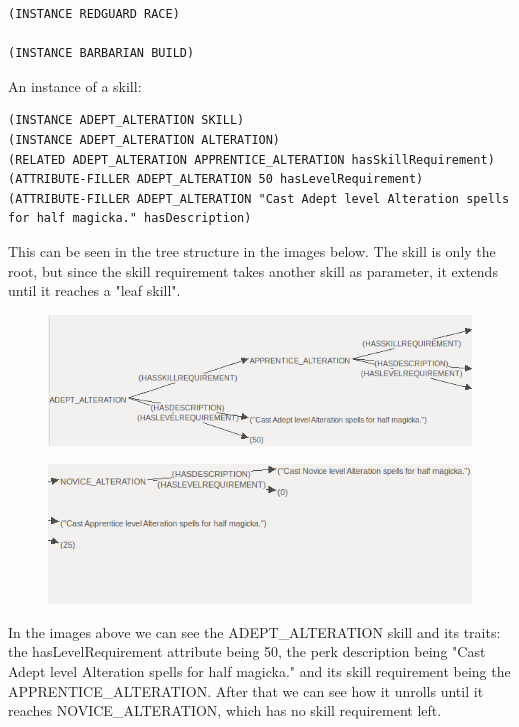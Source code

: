 \documentclass[a4paper,12pt]{report}
\begin{document}
\begin{lstlisting}
(INSTANCE REDGUARD RACE)

(INSTANCE BARBARIAN BUILD)
\end{lstlisting}

An instance of a skill:

\begin{lstlisting}
(INSTANCE ADEPT_ALTERATION SKILL)
(INSTANCE ADEPT_ALTERATION ALTERATION)
(RELATED ADEPT_ALTERATION APPRENTICE_ALTERATION hasSkillRequirement)
(ATTRIBUTE-FILLER ADEPT_ALTERATION 50 hasLevelRequirement)
(ATTRIBUTE-FILLER ADEPT_ALTERATION "Cast Adept level Alteration spells for half magicka." hasDescription)
\end{lstlisting}

This can be seen in the tree structure in the images below. The skill is only the root, but since the skill requirement takes another skill as parameter, it extends until it reaches a "leaf skill".

\begin{figure}[h]
\includegraphics[scale=1]{abox_adept_alteration_p1}
\end{figure}

\begin{figure}[h]
\includegraphics[scale=1]{abox_adept_alteration_p2}
\end{figure}

In the images above we can see the ADEPT\_ALTERATION skill and its traits: the hasLevelRequirement attribute being 50, the perk description being "Cast Adept level Alteration spells for half magicka." and its skill requirement being the APPRENTICE\_ALTERATION. After that we can see how it unrolls until it reaches NOVICE\_ALTERATION, which has no skill requirement left.
\end{document}
